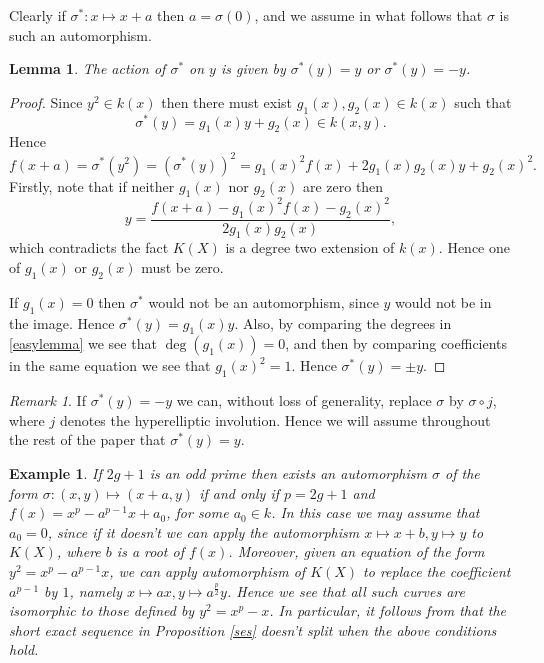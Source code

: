 \documentclass[draft, 11pt]{article} %
\theoremstyle{plain}
\newtheorem{lem}[defn]{Lemma}
\newtheorem{ex}[defn]{Example}
\theoremstyle{remark}
\newtheorem*{rem}{Remark}
\begin{document}
Clearly if $\sigma^* \colon x \mapsto x+a$ then $a = \sigma(0)$, and we assume in what follows that $\sigma$ is such an automorphism.
\begin{lem}
The action of $\sigma^*$ on $y$ is given by $\sigma^*(y) = y$ or $\sigma^*(y) = -y$.
\end{lem}
\begin{proof}
Since $y^2 \in k(x)$ then there must exist $g_1(x), g_2(x) \in k(x)$ such that 
\begin{equation*}
\sigma^*(y) = g_1(x)y + g_2(x) \in k(x,y).
\end{equation*}
Hence
\begin{equation}\label{easylemma}
f(x+a) = \sigma^*(y^2) = (\sigma^*(y))^2 = g_1(x)^2f(x)+2g_1(x)g_2(x)y + g_2(x)^2.
\end{equation}
Firstly, note that if neither $g_1(x)$ nor $g_2(x)$ are zero then
\[
y = \frac{f(x+a) - g_1(x)^2f(x) - g_2(x)^2}{2g_1(x)g_2(x)},
\]
which contradicts the fact $K(X)$ is a degree two extension of $k(x)$.
Hence one of $g_1(x)$ or $g_2(x)$ must be zero.

If $g_1(x) = 0$ then $\sigma^*$ would not be an automorphism, since $y$ would not be in the image.
Hence $\sigma^*(y) = g_1(x)y$.
Also, by comparing the degrees in \eqref{easylemma} we see that $\deg(g_1(x)) = 0$, and then by comparing coefficients in the same equation we see that $g_1(x)^2 = 1$.
Hence $\sigma^*(y) = \pm y$.
\end{proof}
\begin{rem}
If $\sigma^*(y) = -y$ we can, without loss of generality, replace $\sigma$ by $\sigma \circ j$, where $j$ denotes the hyperelliptic involution.
Hence we will assume throughout the rest of the paper that $\sigma^*(y) = y$.
\end{rem}

\begin{ex}
If $2g+1$ is an odd prime then exists an automorphism $\sigma$ of the form $\sigma\colon (x,y) \mapsto (x+a,y)$ if and only if $p=2g+1$ and $f(x) = x^p - a^{p-1}x + a_0$, for some $a_0 \in k$.
In this case we may assume that $a_0 = 0$, since if it doesn't we can apply the automorphism $x \mapsto x+b, y\mapsto y$ to $K(X)$, where $b$ is a root of $f(x)$.
Moreover, given an equation of the form $y^2 = x^p - a^{p-1}x$, we can apply automorphism of $K(X)$ to replace the coefficient $a^{p-1}$ by $1$, namely $x \mapsto ax, y \mapsto a^{\frac{p}{2}}y$.
Hence we see that all such curves are isomorphic to those defined by $y^2 = x^p - x$.
In particular, it follows from \cite{canonicalrepresentation} that the short exact sequence in Proposition \ref{ses} doesn't split when the above conditions hold.
\end{ex}
\end{document}
